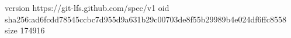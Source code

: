 version https://git-lfs.github.com/spec/v1
oid sha256:ad6fcdd78545ccbc7d955d9a631b29c00703de8f55b29989b4e024df6ffc8558
size 174916
